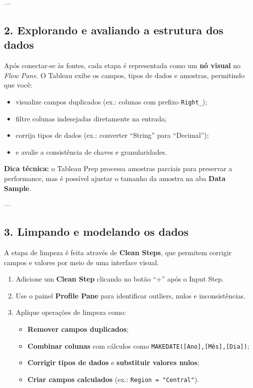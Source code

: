 ---

\subsection*{2. Explorando e avaliando a estrutura dos dados}

Após conectar-se às fontes, cada etapa é representada como um \textbf{nó visual} no \textit{Flow Pane}.  
O Tableau exibe os campos, tipos de dados e amostras, permitindo que você:

\begin{itemize}[leftmargin=*]
  \item visualize campos duplicados (ex.: colunas com prefixo \texttt{Right\_});
  \item filtre colunas indesejadas diretamente na entrada;
  \item corrija tipos de dados (ex.: converter “String” para “Decimal”);
  \item e avalie a consistência de chaves e granularidades.
\end{itemize}

\begin{FormulaBox}
\textbf{Dica técnica:} o Tableau Prep processa amostras parciais para preservar a performance,  
mas é possível ajustar o tamanho da amostra na aba \textbf{Data Sample}.
\end{FormulaBox}

---

\subsection*{3. Limpando e modelando os dados}

A etapa de limpeza é feita através de \textbf{Clean Steps}, que permitem corrigir campos e valores por meio de uma interface visual.

\begin{enumerate}[leftmargin=*]
  \item Adicione um \textbf{Clean Step} clicando no botão “+” após o Input Step.
  \item Use o painel \textbf{Profile Pane} para identificar outliers, nulos e inconsistências.
  \item Aplique operações de limpeza como:
  \begin{itemize}[leftmargin=*]
    \item \textbf{Remover campos duplicados};
    \item \textbf{Combinar colunas} com cálculos como \texttt{MAKEDATE([Ano],[Mês],[Dia])};
    \item \textbf{Corrigir tipos de dados} e \textbf{substituir valores nulos};
    \item \textbf{Criar campos calculados} (ex.: \texttt{Region = "Central"}).
  \end{itemize}
\end{enumerate}

